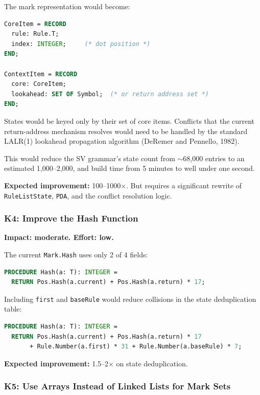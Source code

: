 \documentclass[11pt]{article}
\begin{document}
The mark representation would become:

\begin{lstlisting}[language=Modula2]
CoreItem = RECORD
  rule: Rule.T;
  index: INTEGER;     (* dot position *)
END;

ContextItem = RECORD
  core: CoreItem;
  lookahead: SET OF Symbol;  (* or return address set *)
END;
\end{lstlisting}

States would be keyed only by their set of core items.  Conflicts
that the current return-address mechanism resolves would need to be
handled by the standard LALR(1) lookahead propagation algorithm
(DeRemer and Pennello, 1982).

This would reduce the SV grammar's state count from $\sim$68,000
entries to an estimated 1,000--2,000, and build time from 5 minutes to
well under one second.

\textbf{Expected improvement:} 100--1000$\times$.  But requires a
significant rewrite of \texttt{RuleListState}, \texttt{PDA}, and
the conflict resolution logic.

\subsubsection{K4: Improve the Hash Function}

\textbf{Impact: moderate. \quad Effort: low.}

The current \texttt{Mark.Hash} uses only 2 of 4 fields:

\begin{lstlisting}[language=Modula2]
PROCEDURE Hash(a: T): INTEGER =
  RETURN Pos.Hash(a.current) + Pos.Hash(a.return) * 17;
\end{lstlisting}

Including \texttt{first} and \texttt{baseRule} would reduce collisions
in the state deduplication table:

\begin{lstlisting}[language=Modula2]
PROCEDURE Hash(a: T): INTEGER =
  RETURN Pos.Hash(a.current) + Pos.Hash(a.return) * 17
       + Rule.Number(a.first) * 31 + Rule.Number(a.baseRule) * 7;
\end{lstlisting}

\textbf{Expected improvement:} 1.5--2$\times$ on state deduplication.

\subsubsection{K5: Use Arrays Instead of Linked Lists for Mark Sets}
\end{document}
